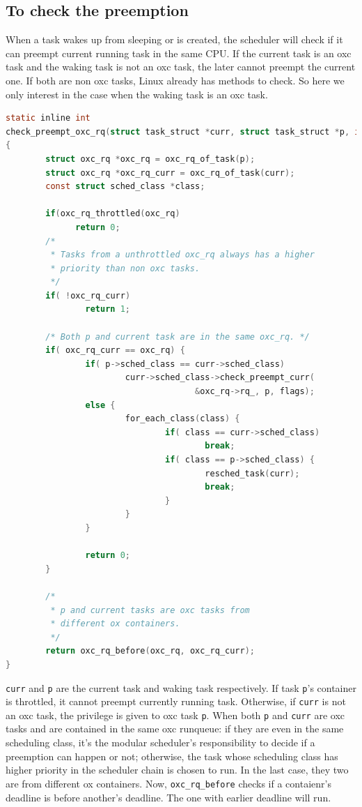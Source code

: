 \subsection{To check the preemption}
When a task wakes up from sleeping or is created, the scheduler will check 
if it can preempt current running task in the same CPU. If the current task
is an oxc task and the waking task is not an oxc task, the later cannot
preempt the current one. If both are non oxc tasks, Linux already has methods
to check. So here we only interest in the case when the waking task is an
oxc task.

\begin{lstlisting}[language=C, 
		caption={The preemption check under oxc framework},
		label={check_preempt}]
static inline int
check_preempt_oxc_rq(struct task_struct *curr, struct task_struct *p, int flags)
{
        struct oxc_rq *oxc_rq = oxc_rq_of_task(p);
        struct oxc_rq *oxc_rq_curr = oxc_rq_of_task(curr);
        const struct sched_class *class;

        if(oxc_rq_throttled(oxc_rq)
              return 0;
        /* 
         * Tasks from a unthrottled oxc_rq always has a higher 
         * priority than non oxc tasks.
         */
        if( !oxc_rq_curr)
                return 1;

        /* Both p and current task are in the same oxc_rq. */
        if( oxc_rq_curr == oxc_rq) {
                if( p->sched_class == curr->sched_class) 
                        curr->sched_class->check_preempt_curr(
                                      &oxc_rq->rq_, p, flags);
                else {
                        for_each_class(class) {
                                if( class == curr->sched_class)
                                        break;
                                if( class == p->sched_class) {
                                        resched_task(curr);
                                        break;
                                }
                        }
                }

                return 0;
        }

        /* 
         * p and current tasks are oxc tasks from 
         * different ox containers. 
         */
        return oxc_rq_before(oxc_rq, oxc_rq_curr);
}
\end{lstlisting}
\texttt{curr} and \texttt{p} are the current task and waking task 
respectively. If task \texttt{p}'s container is throttled, it cannot 
preempt currently running task. Otherwise, if \texttt{curr} is not an 
oxc task, the privilege is given to oxc task \texttt{p}.
When both \texttt{p} and \texttt{curr} are oxc tasks and are contained 
in the same oxc runqueue: if they are even in the same scheduling class, 
it's the modular scheduler's responsibility to decide if a preemption 
can happen or not; otherwise, the task whose scheduling class has higher 
priority in the scheduler chain is chosen to run. In the last case, they 
two are from different ox containers. Now, \texttt{oxc\_rq\_before} 
checks if a contaienr's deadline is before another's deadline. The one 
with earlier deadline will run. 

